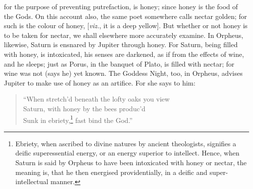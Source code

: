 \documentclass[a4paper,12pt]{article}
\begin{document}
for the purpose of preventing putrefaction, is honey; since honey is the food
of the Gods. On this account also, the same poet somewhere calls nectar golden;
for such is the colour of honey, [\textit{viz.}, it is a deep yellow]. But
whether or not honey is to be taken for nectar, we shall elsewhere more
accurately examine. In Orpheus, likewise, Saturn is ensnared by Jupiter through
honey. For Saturn, being filled with honey, is intoxicated, his senses are
darkened, as if from the effects of wine, and he sleeps; just as Porus, in the
banquet of Plato, is filled with nectar; for wine was not (says he) yet known.
The Goddess Night, too, in Orpheus, advises Jupiter to make use of honey as an
artifice. For she says to him:

\begin{verse}
``When stretch'd beneath the lofty oaks you view\\
Saturn, with honey by the bees produc'd\\
Sunk in ebriety,\footnote{Ebriety, when ascribed to divine natures by ancient
theologists, signifies a deific superessential energy, or an energy superior to
intellect. Hence, when Saturn is said by Orpheus to have been intoxicated with
honey or nectar, the meaning is, that he then energised providentially, in a
deific and super-intellectual manner.} fast bind the God.''
\end{verse}
\end{document}
